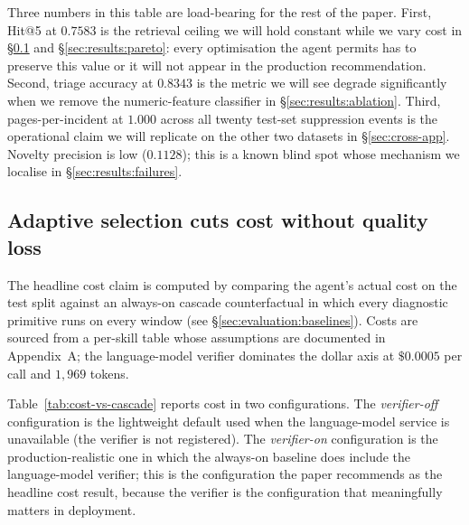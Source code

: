 Three numbers in this table are load-bearing for the rest of the paper. First, Hit@5 at $0.7583$ is the retrieval ceiling we will hold constant while we vary cost in \S\ref{sec:results:cost} and \S\ref{sec:results:pareto}: every optimisation the agent permits has to preserve this value or it will not appear in the production recommendation. Second, triage accuracy at $0.8343$ is the metric we will see degrade significantly when we remove the numeric-feature classifier in \S\ref{sec:results:ablation}. Third, pages-per-incident at $1.000$ across all twenty test-set suppression events is the operational claim we will replicate on the other two datasets in \S\ref{sec:cross-app}. Novelty precision is low ($0.1128$); this is a known blind spot whose mechanism we localise in \S\ref{sec:results:failures}.

\subsection{Adaptive selection cuts cost without quality loss}
\label{sec:results:cost}

The headline cost claim is computed by comparing the agent's actual cost on the \dsob{} test split against an always-on cascade counterfactual in which every diagnostic primitive runs on every window (see \S\ref{sec:evaluation:baselines}). Costs are sourced from a per-skill table whose assumptions are documented in Appendix~A; the language-model verifier dominates the dollar axis at $\$0.0005$ per call and $1{,}969$ tokens.

Table~\ref{tab:cost-vs-cascade} reports cost in two configurations. The \emph{verifier-off} configuration is the lightweight default used when the language-model service is unavailable (the verifier is not registered). The \emph{verifier-on} configuration is the production-realistic one in which the always-on baseline does include the language-model verifier; this is the configuration the paper recommends as the headline cost result, because the verifier is the configuration that meaningfully matters in deployment.

